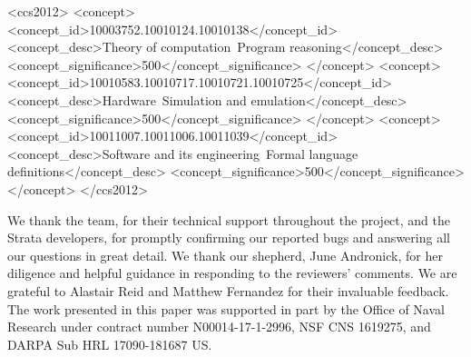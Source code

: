 \documentclass[sigplan,screen]{acmart}
\begin{document}
%
%
\begin{CCSXML}
<ccs2012>
<concept>
<concept_id>10003752.10010124.10010138</concept_id>
<concept_desc>Theory of computation~Program reasoning</concept_desc>
<concept_significance>500</concept_significance>
</concept>
<concept>
<concept_id>10010583.10010717.10010721.10010725</concept_id>
<concept_desc>Hardware~Simulation and emulation</concept_desc>
<concept_significance>500</concept_significance>
</concept>
<concept>
<concept_id>10011007.10011006.10011039</concept_id>
<concept_desc>Software and its engineering~Formal language definitions</concept_desc>
<concept_significance>500</concept_significance>
</concept>
</ccs2012>
\end{CCSXML}


%

%
\maketitle










%

%


\begin{acks}
We thank the \K team, for their technical support throughout the project, and
the Strata developers, for promptly confirming our reported bugs
and answering all our questions in great detail.  We thank our shepherd,
June Andronick, for her diligence and helpful guidance in responding to the
reviewers' comments. We are grateful to Alastair Reid and Matthew Fernandez
for their invaluable feedback.
The work presented in this paper was supported in part by
the Office of Naval Research under contract number N00014-17-1-2996,
NSF CNS 1619275,
and DARPA Sub HRL 17090-181687 US.
\end{acks}

%
\balance




%
\end{document}
